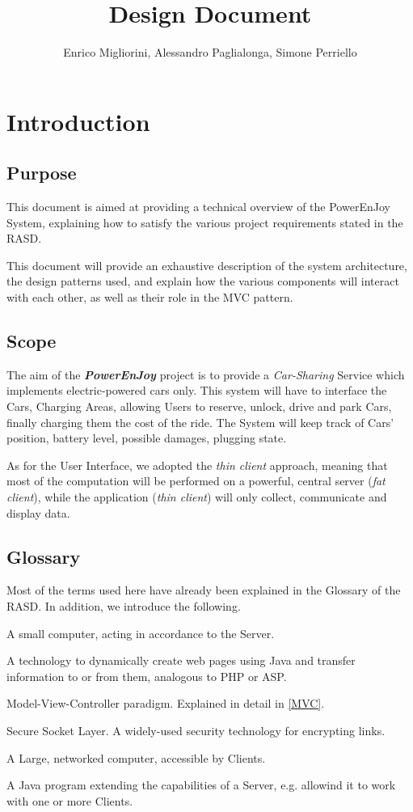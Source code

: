 \documentclass[12pt]{article}
\title{Design Document}
\author{Enrico Migliorini, Alessandro Paglialonga, Simone Perriello}
\begin{document}
\maketitle
\clearpage
\tableofcontents
\clearpage

\section{Introduction}
\subsection{Purpose}
This document is aimed at providing a technical overview of the PowerEnJoy System, explaining how to satisfy the various project requirements stated in the RASD.

This document will provide an exhaustive description of the system architecture, the design patterns used, and explain how the various components will interact with each other, as well as their role in the MVC pattern.
\subsection{Scope}
The aim of the \textbf{\emph{PowerEnJoy}} project is to provide a \textit{Car-Sharing} Service which implements electric-powered cars only.
This system will have to interface the Cars, Charging Areas, allowing Users to reserve, unlock, drive and park Cars, finally charging them the cost of the ride. 
The System will keep track of Cars' position, battery level, possible damages, plugging state.

As for the User Interface, we adopted the \emph{thin client} approach, meaning that most of the computation will be performed on a powerful, central server (\emph{fat client}), while the application (\emph{thin client}) will only collect, communicate and display data.
\subsection{Glossary}
Most of the terms used here have already been explained in the Glossary of the RASD. In addition, we introduce the following.
\begin{description}[leftmargin=!,labelwidth=\widthof{\bfseries Servlet}]
	\item[Client] A small computer, acting in accordance to the Server.
	\item[JSP] A technology to dynamically create web pages using Java and transfer information to or from them, analogous to PHP or ASP.
	\item[MVC] Model-View-Controller paradigm. Explained in detail in \ref{MVC}.
	\item[SSL] Secure Socket Layer. A widely-used security technology for encrypting links.
	\item[Server] A Large, networked computer, accessible by Clients.
	\item[Servlet] A Java program extending the capabilities of a Server, e.g. allowind it to work with one or more Clients.
\end{description}
\end{document}
